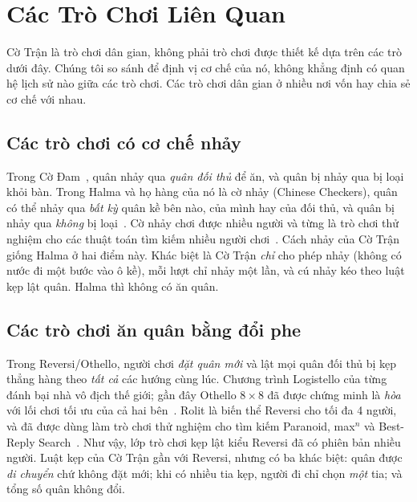 \section{Các Trò Chơi Liên Quan}
\label{sec:related}

Cờ Trận là trò chơi dân gian, không phải trò chơi được thiết kế dựa trên
các trò dưới đây. Chúng tôi so sánh để định vị cơ chế của nó, không khẳng
định có quan hệ lịch sử nào giữa các trò chơi. Các trò chơi dân gian ở
nhiều nơi vốn hay chia sẻ cơ chế với nhau.

\subsection{Các trò chơi có cơ chế nhảy}

Trong Cờ Đam~\citep{schaeffer2007checkers}, quân nhảy qua \emph{quân đối
thủ} để ăn, và quân bị nhảy qua bị loại khỏi bàn. Trong Halma và họ hàng
của nó là cờ nhảy (Chinese Checkers), quân có thể nhảy qua \emph{bất kỳ}
quân kề bên nào, của mình hay của đối thủ, và quân bị nhảy qua \emph{không}
bị loại~\citep{britannica_halma}. Cờ nhảy chơi được nhiều người và từng là
trò chơi thử nghiệm cho các thuật toán tìm kiếm nhiều người
chơi~\citep{nijssen2013mcts}. Cách nhảy của Cờ Trận giống Halma ở hai điểm
này. Khác biệt là Cờ Trận \emph{chỉ} cho phép nhảy (không có nước đi một
bước vào ô kề), mỗi lượt chỉ nhảy một lần, và cú nhảy kéo theo luật kẹp
lật quân. Halma thì không có ăn quân.

\subsection{Các trò chơi ăn quân bằng đổi phe}

Trong Reversi/Othello, người chơi \emph{đặt quân mới} và lật mọi quân đối
thủ bị kẹp thẳng hàng theo \emph{tất cả} các hướng cùng lúc. Chương trình
Logistello của \citet{buro1997othello} từng đánh bại nhà vô địch thế giới;
gần đây Othello $8\times8$ đã được chứng minh là \emph{hòa} với lối chơi
tối ưu của cả hai bên~\citep{takizawa2023othello}. Rolit là biến thể
Reversi cho tối đa 4 người, và đã được dùng làm trò chơi thử nghiệm cho
tìm kiếm Paranoid, max$^n$ và Best-Reply
Search~\citep{schadd2011brs,nijssen2013mcts}. Như vậy,
lớp trò chơi kẹp lật kiểu Reversi đã có phiên bản nhiều người. Luật kẹp
của Cờ Trận gần với Reversi, nhưng có ba khác biệt: quân được \emph{di
chuyển} chứ không đặt mới; khi có nhiều tia kẹp, người đi chỉ chọn
\emph{một} tia; và tổng số quân không đổi.

